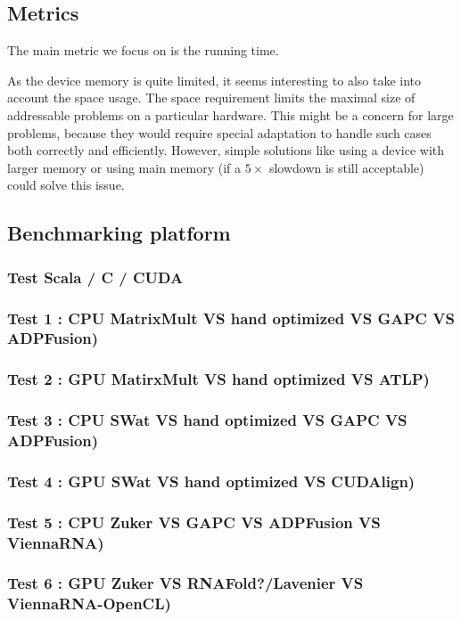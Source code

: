 \subsection{Metrics}
{\color{red} The main metric we focus on is the running time.}

As the device memory is quite limited, it seems interesting to also take into account the space usage. The space requirement limits the maximal size of addressable problems  on a particular hardware. This might be a concern for large problems, because they would require special adaptation to handle such cases both correctly and efficiently. However, simple solutions like using a device with larger memory or using main memory (if a $5\times$ slowdown is still acceptable) could solve this issue.

\subsection{Benchmarking platform}

\subsubsection{Test Scala / C / CUDA}
\subsubsection{Test 1 : CPU MatrixMult VS hand optimized VS GAPC VS ADPFusion)}
\subsubsection{Test 2 : GPU MatirxMult VS hand optimized VS ATLP)}
\subsubsection{Test 3 : CPU SWat VS hand optimized VS GAPC VS ADPFusion)}
\subsubsection{Test 4 : GPU SWat VS hand optimized VS CUDAlign)}
\subsubsection{Test 5 : CPU Zuker VS GAPC VS ADPFusion VS ViennaRNA)}
\subsubsection{Test 6 : GPU Zuker VS RNAFold?/Lavenier VS ViennaRNA-OpenCL)}

